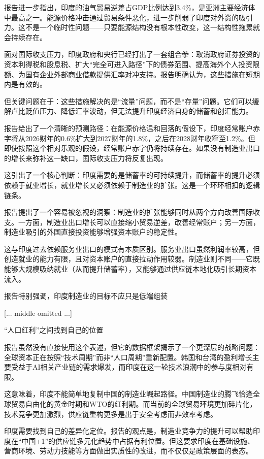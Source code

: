 \documentclass[11pt]{ctexart}
\begin{document}
报告进一步指出，印度的油气贸易逆差占GDP比例达到3.4\%，是亚洲主要经济体中最高之一。能源价格冲击通过贸易条件恶化，进一步削弱了印度对外资的吸引力。这不是一个临时性问题——只要能源结构没有根本性改变，这一结构性拖累就会持续存在。

面对国际收支压力，印度政府和央行已经打出了一套组合拳：取消政府证券投资的资本利得税和股息税、扩大“完全可进入路径”下的债券范围、提高海外个人投资限额、为国有企业外部商业借款提供汇率对冲支持。报告明确认为，这些措施在短期内是有效的。

但关键问题在于：这些措施解决的是“流量”问题，而不是“存量”问题。它们可以缓解卢比贬值压力、降低汇率波动，但无法提升印度经济自身的储蓄和创汇能力。

报告给出了一个清晰的预测路径：在能源价格温和回落的假设下，印度经常账户赤字将从2026财年的0.6\%扩大到2027财年的1.8\%，之后在2028财年收窄至1.2\%。但即使按照这个相对乐观的假设，经常账户赤字仍将持续存在。如果没有制造业出口的增长来弥补这一缺口，国际收支压力将反复出现。

这引出了一个核心判断：印度需要的是储蓄率的可持续提升，而储蓄率的提升必须依赖于就业增长，就业增长又必须依赖于制造业的扩张。这是一个环环相扣的逻辑链条。

报告提出了一个容易被忽视的洞察：制造业的扩张能够同时从两个方向改善国际收支。一方面，制造业出口增长可以直接缩小贸易逆差，改善经常账户；另一方面，制造业吸引的外国直接投资能够增强资本账户的稳定性。

这与印度过去依赖服务业出口的模式有本质区别。服务业出口虽然利润率较高，但创造就业的能力有限，且对资本账户的直接拉动作用较弱。制造业则不同——它既能够大规模吸纳就业（从而提升储蓄率），又能够通过供应链本地化吸引长期资本流入。

报告特别强调，印度制造业的目标不应只是低端组装

[... middle omitted ...]

“人口红利”之间找到自己的位置

报告虽然没有直接使用这个表述，但它的数据框架揭示了一个更深层的战略问题：全球资本正在按照“技术周期”而非“人口周期”重新配置。韩国和台湾的盈利增长主要受益于AI相关产业链的需求爆发，而印度在这一轮技术浪潮中的参与度相对有限。

这意味着，印度不能简单地复制中国的制造业崛起路径。中国制造业的腾飞恰逢全球贸易自由化的黄金时期和WTO的红利期。而当前的全球贸易环境更加碎片化，技术竞争更加激烈，供应链重构更多是出于安全考虑而非效率考虑。

印度需要找到自己的差异化定位。报告的观点是，制造业竞争力的提升可以帮助印度在“中国+1”的供应链多元化趋势中占据有利位置。但这要求印度在基础设施、营商环境、劳动力技能等方面做出实质性的改进，而不仅仅是政策层面的表态。
\end{document}
